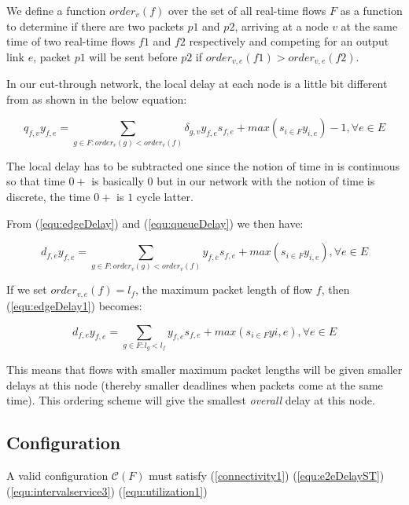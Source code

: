 \documentclass[a4]{article}
\begin{document}
We define a function $order_v(f)$ over the set of all real-time flows $F$
as a function to determine if there are two packets $p1$ and $p2$, arriving at a
node $v$ at the same time of two real-time flows $f1$ and $f2$ respectively
and competing for an output link $e$, packet $p1$ will be sent before $p2$ if
$order_{v,e}(f1) > order_{v,e}(f2)$.


In our cut-through network, the local delay at each node is a little bit
different from \cite{Ferrari90ascheme} as shown in the below equation:

\begin{equation}\label{equ:queueDelay}
q_{f,v}y_{f,e} = \sum_{g \in F:order_v(g) <
order_v(f)}\delta_{g,v}y_{f,e}s_{f,e} + max(s_{i \in F}y_{i,e})-1, \forall e \in
E
\end{equation}

The local delay has to be subtracted one since the notion of time in
\cite{Ferrari90ascheme} is continuous so that time $0+$ is basically $0$ but in
our network with the notion of time is discrete, the time $0+$ is $1$ cycle
latter.

From (\ref{equ:edgeDelay}) and (\ref{equ:queueDelay}) we then have:

\begin{equation}\label{equ:edgeDelay1}
d_{f,e}y_{f,e} = \sum_{g \in F:order_v(g) <
order_v(f)}y_{f,e}s_{f,e} + max(s_{i \in F}y_{i,e}), \forall e \in
E
\end{equation}

If we set $order_{v,e}(f)=l_f$, the maximum packet length of flow $f$, then
(\ref{equ:edgeDelay1}) becomes:

\begin{equation}\label{equ:edgeDelayPacketLength}
d_{f,e}y_{f,e} = \sum_{g \in F:l_g < l_f}y_{f,e}s_{f,e} +
max(s_{i \in F}y{i,e}), \forall e \in E
\end{equation}

This means that flows with smaller maximum packet lengths will be given smaller
delays at this node (thereby smaller deadlines when packets come at the same time). This ordering scheme 
will give the smallest {\em overall} delay at this node.

\subsection{Configuration}
A valid configuration $\mathcal{C}(F)$ must satisfy (\ref{connectivity1}) 
(\ref{equ:e2eDelayST}) (\ref{equ:intervalservice3}) (\ref{equ:utilization1})
\end{document}

